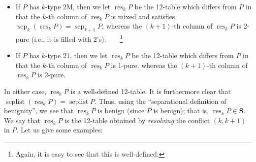 \documentclass[numbers=enddot,12pt,final,onecolumn,notitlepage]{scrartcl}%
\theoremstyle{definition}
\begin{document}
\begin{itemize}
\item If $P$ has $k$-type 2M, then we let $\operatorname*{res}_{k}P$ be the
12-table which differs from $P$ in that the $k$-th column of
$\operatorname*{res}_{k}P$ is mixed and satisfies $\operatorname*{sep}%
\nolimits_{k}\left(  \operatorname*{res}\nolimits_{k}P\right)
=\operatorname*{sep}\nolimits_{k+1}P$, whereas the $\left(  k+1\right)  $-th
column of $\operatorname*{res}\nolimits_{k}P$ is 2-pure (i.e., it is filled
with $2$'s).\ \ \ \ \footnote{Again, it is easy to see that this is
well-defined.}

\item If $P$ has $k$-type 21, then we let $\operatorname*{res}_{k}P$ be the
12-table which differs from $P$ in that the $k$-th column of
$\operatorname*{res}_{k}P$ is 1-pure, whereas the $\left(  k+1\right)  $-th
column of $\operatorname*{res}\nolimits_{k}P$ is 2-pure.
\end{itemize}

In either case, $\operatorname*{res}\nolimits_{k}P$ is a well-defined
12-table. It is furthermore clear that $\operatorname*{seplist}\left(
\operatorname*{res}\nolimits_{k}P\right)  =\operatorname*{seplist}P$. Thus,
using the \textquotedblleft separational definition of
benignity\textquotedblright, we see that $\operatorname*{res}\nolimits_{k}P$
is benign (since $P$ is benign); that is, $\operatorname*{res}\nolimits_{k}%
P\in\mathbf{S}$. We say that $\operatorname*{res}\nolimits_{k}P$ is the
12-table obtained by \textit{resolving} the conflict $\left(  k,k+1\right)  $
in $P$. Let us give some examples:
\end{document}
